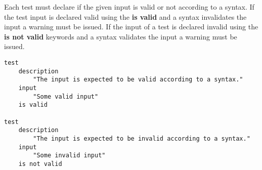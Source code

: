 

Each test must declare if the given input is valid or not according to a syntax. 
If the test input is declared valid using the \textbf{is valid} and a syntax 
invalidates the input a warning must be issued. If the input of a test is 
declared invalid using the \textbf{is not valid} keywords and a syntax validates
the input a warning must be issued.

\begin{lstlisting}[style = SrtL]
test
    description
        "The input is expected to be valid according to a syntax."
    input 
        "Some valid input"
    is valid

test
    description
        "The input is expected to be invalid according to a syntax."
    input 
        "Some invalid input"
    is not valid
\end{lstlisting}